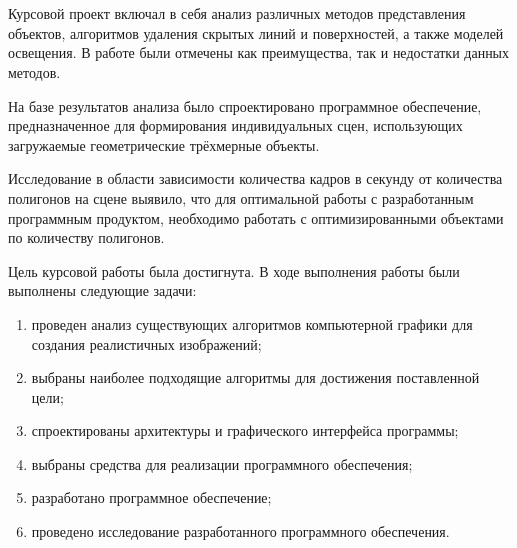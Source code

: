 \chapter*{}

Курсовой проект включал в себя анализ различных методов представления объектов, алгоритмов удаления скрытых линий и поверхностей, а также моделей освещения.
В работе были отмечены как преимущества, так и недостатки данных методов.

На базе результатов анализа было спроектировано программное обеспечение, предназначенное для формирования индивидуальных сцен, использующих загружаемые геометрические трёхмерные объекты.

Исследование в области зависимости количества кадров в секунду от количества полигонов на сцене выявило, что для оптимальной работы с разработанным программным продуктом, необходимо работать с оптимизированными объектами по количеству полигонов.

Цель курсовой работы была достигнута.
В ходе выполнения работы были выполнены следующие задачи:
\begin{enumerate}[label=\arabic*)]
	\item проведен анализ существующих алгоритмов компьютерной графики для создания реалистичных изображений;
	\item выбраны наиболее подходящие алгоритмы для достижения поставленной цели;
	\item спроектированы архитектуры и графического интерфейса программы;
	\item выбраны средства для реализации программного обеспечения;
	\item разработано программное обеспечение;
	\item проведено исследование разработанного программного обеспечения.
\end{enumerate}
